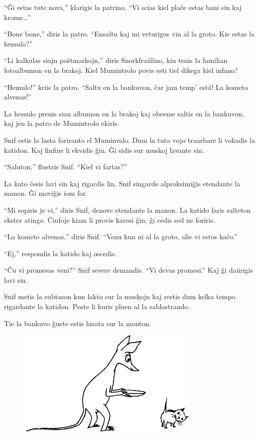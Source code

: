 ``Ĝi estas tute nova,'' klarigis la patrino. ``Vi scias kiel plaĉe estas bani sin kaj krome{\ldots}''

``Bone bone,'' diris la patro. ``Ensaltu kaj mi veturigos vin al la groto. Kie estas la hemulo?''

``Li kalkulas siajn poŝtmarkojn,'' diris Snorkfraŭlino, kiu tenis la familian fotoalbumon en la brakoj. Kiel Mumintrolo povis esti tiel dikega kiel infano?

``Hemulo!'' kriis la patro. ``Saltu en la bankuvon, ĉar jam temp' está! La kometo alvenas!''

La hemulo prenis sian albumon en la brakoj kaj obeeme saltis en la bankuvon, kaj jen la patro de Mumintrolo ekiris.

Snif estis la lasta foriranto el Muminvalo. Dum la tuta vojo traarbare li vokadis la katidon. Kaj finfine li ekvidis ĝin. Ĝi sidis sur muskoj lavante sin.

``Saluton,'' flustris Snif. ``Kiel vi fartas?''

La kato ĉesis lavi sin kaj rigardis lin. Snif singarde alproksimiĝis etendante la manon. Ĝi moviĝis iom for.

``Mi sopiris je vi,'' diris Snif, denove etendante la manon. La katido faris salteton ekster atingo. Ĉiufoje kiam li provis karesi ĝin, ĝi cedis sed ne foriris.

``La kometo alvenas,'' diris Snif. ``Venu kun ni al la groto, alie vi estos kaĉo.''

``Ej,'' respondis la katido kaj oscedis.

``Ĉu vi promesas veni?'' Snif severe demandis. ``Vi devas promesi.'' Kaj ĝi daŭrigis lavi sin.

Snif metis la subtason kun lakto sur la muskojn kaj restis dum kelka tempo rigardante la katidon. Poste li kuris pluen al la sablostrando.

Tie la bankuvo ĝuste estis hisata sur la monton.

\begin{figure}[htbp]
\centering
\includegraphics[width=250pt,height=147pt]{9-5.png}
\caption{}
\label{9-5}
\end{figure}


